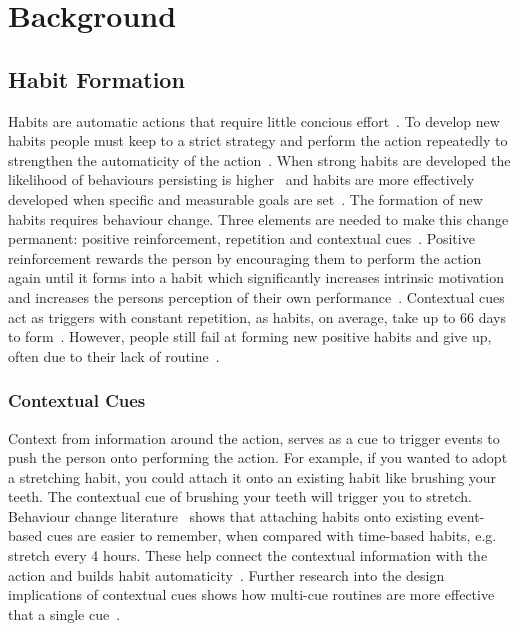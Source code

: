 \newpage

\section{Background}

\subsection{Habit Formation}
Habits are automatic actions that require little concious effort~\cite{article_the_habitual_consumer}. To develop new habits people must keep to a strict strategy and perform the action repeatedly to strengthen the automaticity of the action~\cite{article_promoting_habit_formation}. When strong habits are developed the likelihood of behaviours persisting is higher~\cite{putting_habit_into_practice} and habits are more effectively developed when specific and measurable goals are set~\cite{habits_better_when_have_specific_and_measurable_goals}. The formation of new habits requires behaviour change. Three elements are needed to make this change permanent: positive reinforcement, repetition and contextual cues~\cite{article_experiences_of_habit_formation}. Positive reinforcement rewards the person by encouraging them to perform the action again until it forms into a habit which significantly increases intrinsic motivation and increases the persons perception of their own performance~\cite{positive_reinforcement_pro}. Contextual cues act as triggers with constant repetition, as habits, on average, take up to 66 days to form~\cite{article_how_habits_formed_modelling_habit_formation}.
However, people still fail at forming new positive habits and give up, often due to their lack of routine~\cite{article_the_habitual_consumer, article_promoting_habit_formation}.

\subsubsection*{Contextual Cues}
Context from information around the action, serves as a cue to trigger events to push the person onto performing the action. For example, if you wanted to adopt a stretching habit, you could attach it onto an existing habit like brushing your teeth. The contextual cue of brushing your teeth will trigger you to stretch. Behaviour change literature~\cite{article_implementation_intentions_multicue} shows that attaching habits onto existing event-based cues are easier to remember, when compared with time-based habits, e.g. stretch every 4 hours. These help connect the contextual information with the action and builds habit automaticity~\cite{article_implementation_intentions}. Further research into the design implications of contextual cues shows how multi-cue routines are more effective that a single cue~\cite{article_understanding_use_contextual_cues_design_impl}.


